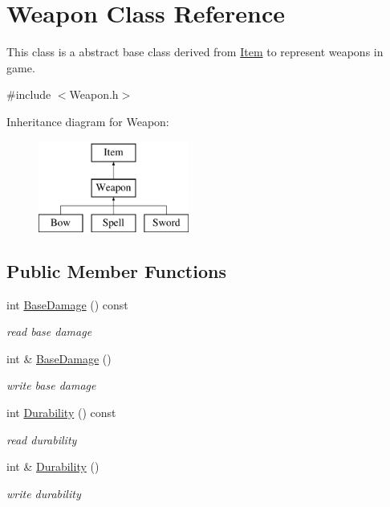 \hypertarget{classWeapon}{\section{Weapon Class Reference}
\label{classWeapon}
}


This class is a abstract base class derived from \hyperlink{classItem}{Item} to represent weapons in game.  




{\ttfamily \#include $<$Weapon.\-h$>$}

Inheritance diagram for Weapon\-:\begin{figure}[H]
\begin{center}
\leavevmode
\includegraphics[height=3.000000cm]{classWeapon}
\end{center}
\end{figure}
\subsection*{Public Member Functions}
\begin{DoxyCompactItemize}
\item 
int \hyperlink{classWeapon_a8a98e2d7fa882c4e0bb1f58394ee8a70}{Base\-Damage} () const 
\begin{DoxyCompactList}\small\item\em read base damage \end{DoxyCompactList}\item 
int \& \hyperlink{classWeapon_a45379f8f35327420270443f54910f83d}{Base\-Damage} ()
\begin{DoxyCompactList}\small\item\em write base damage \end{DoxyCompactList}\item 
int \hyperlink{classWeapon_aa67ac6bc8b0e4a59211ff6c8a36286bc}{Durability} () const 
\begin{DoxyCompactList}\small\item\em read durability \end{DoxyCompactList}\item 
int \& \hyperlink{classWeapon_ac7f3223ff4dcf411ee0f17d70dedc6fb}{Durability} ()
\begin{DoxyCompactList}\small\item\em write durability \end{DoxyCompactList}\end{DoxyCompactItemize}
